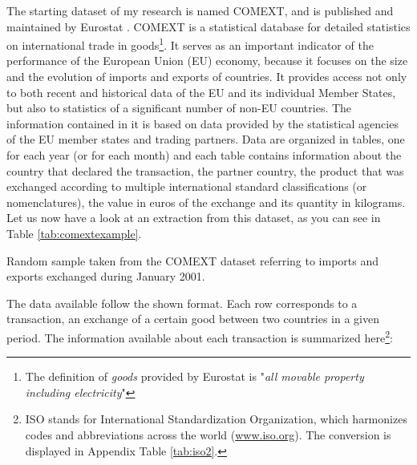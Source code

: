 The starting dataset of my research is named COMEXT, and is published and maintained by Eurostat \cite{eurostat2022comext}. COMEXT is a statistical database for detailed statistics on international trade in goods\footnote{The definition of \textit{goods} provided by Eurostat is "\textit{all movable property including electricity}"}. It serves as an important indicator of the performance of the European Union (EU) economy, because it focuses on the size and the evolution of imports and exports of countries. It provides access not only to both recent and historical data of the EU and its individual Member States, but also to statistics of a significant number of non-EU countries. The information contained in it is based on data provided by the statistical agencies of the EU member states and trading partners.
Data are organized in tables, one for each year (or for each month) and each table contains information about the country that declared the transaction, the partner country, the product that was exchanged according to multiple international standard classifications (or nomenclatures), the value in euros of the exchange and its quantity in kilograms.
Let us now have a look at an extraction from this dataset, as you can see in Table \ref{tab:comextexample}.
\begin{landscape}
\begin{table}\label{tab:comextexample}
    \centering
    
    \caption{Random sample taken from the COMEXT dataset referring to imports and exports exchanged during January 2001.}
\end{table}
\end{landscape}
The data available follow the shown format. Each row corresponds to a transaction, an exchange of a certain good between two countries in a given period. The information available about each transaction is summarized here\footnote{ISO stands for International Standardization Organization, which harmonizes codes and abbreviations across the world (\url{www.iso.org}). The conversion is displayed in Appendix Table \ref{tab:iso2}.}:
